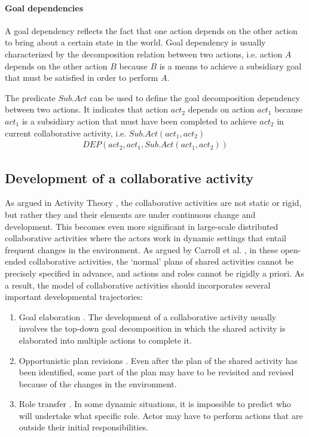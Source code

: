 \paragraph*{Goal dependencies} %
\label{par:goal_dependencies}
A goal dependency reflects the fact that one action depends on the other action to bring about a certain state in the world. Goal dependency is usually characterized by the decomposition relation between two actions, i.e. action $A$ depends on the other action $B$ because $B$ is a means to achieve a subsidiary goal that must be satisfied in order to perform $A$.

The predicate $Sub.Act$ can be used to define the goal decomposition dependency between two actions. It indicates that action $act_2$ depends on action $act_1$ because $act_1$ is a subsidiary action that must have been completed to achieve $act_2$ in current collaborative activity, i.e. $Sub.Act(act_1, act_2)$
\begin{align*} 
	 DEP(act_2, act_1, Sub.Act(act_1, act_2))
\end{align*}

\subsection{Development of a collaborative activity} %
\label{sub:development_of_a_collaborative_activity}
As argued in Activity Theory \cite{nardi1996context}, the collaborative activities are not static or rigid, but rather they and their elements are under continuous change and development. This becomes even more significant in large-scale distributed collaborative activities where the actors work in dynamic settings that entail frequent changes in the environment. As argued by Carroll et al. \cite{carroll2006a}, in these open-ended collaborative activities, the `normal' plans of shared activities cannot be precisely specified in advance, and actions and roles cannot be rigidly a priori. As a result, the model of collaborative activities should incorporates several important developmental trajectories:

\begin{enumerate}
 	\item Goal elaboration \cite{Grosz2006}. The development of a collaborative activity usually involves the top-down goal decomposition in which the shared activity is elaborated into multiple actions to complete it. 
 	\item Opportunistic plan revisions \cite{suchman1987plans}. Even after the plan of the shared activity has been identified, some part of the plan may have to be revisited and revised because of the changes in the environment.
 	\item Role transfer \cite{Turoff2004}. In some dynamic situations, it is impossible to predict who will undertake what specific role. Actor may have to perform actions that are outside their initial responsibilities.
 \end{enumerate} 

